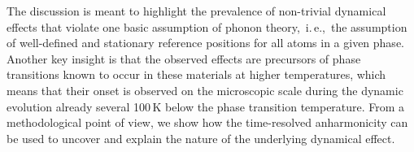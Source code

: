 The discussion is meant to highlight the prevalence of non-trivial dynamical effects that violate one basic assumption of phonon theory,~i.\,e.,~the assumption of well-defined and stationary reference positions for all atoms in a given phase. Another key insight is that the observed effects are precursors of phase transitions known to occur in these materials at higher temperatures, which means that their onset is observed on the microscopic scale during the dynamic evolution already several 100\,K below the phase transition temperature.
From a methodological point of view, we show how the time-resolved anharmonicity can be used to uncover and explain the nature of the underlying dynamical effect.


\newpage

